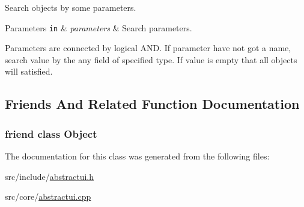 Search objects by some parameters. 


\begin{DoxyParams}[1]{Parameters}
\mbox{\tt in}  & {\em parameters} & Search parameters.\\
\hline
\end{DoxyParams}
Parameters are connected by logical AND. If parameter have not got a name, search value by the any field of specified type. If value is empty that all objects will satisfied. 

\subsection{Friends And Related Function Documentation}
\hypertarget{classCore_1_1AbstractUI_a0720b5f434e636e22a3ed34f847eec57}{
\subsubsection[{Object}]{\setlength{\rightskip}{0pt plus 5cm}friend class {\bf Object}}}
\label{d1/d45/classCore_1_1AbstractUI_a0720b5f434e636e22a3ed34f847eec57}


The documentation for this class was generated from the following files:\begin{DoxyCompactItemize}
\item 
src/include/\hyperlink{abstractui_8h}{abstractui.h}\item 
src/core/\hyperlink{abstractui_8cpp}{abstractui.cpp}\end{DoxyCompactItemize}
